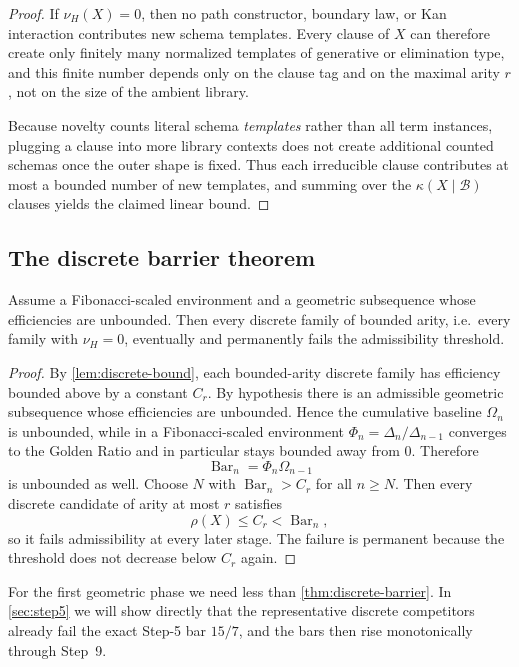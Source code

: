 \documentclass{lmcs}
\newcommand{\B}{\mathcal{B}}
\newcommand{\SelBar}{\operatorname{Bar}}
\begin{document}
\begin{proof}
If $\nu_H(X)=0$, then no path constructor, boundary law, or Kan interaction contributes new schema templates. Every clause of $X$ can therefore create only finitely many normalized templates of generative or elimination type, and this finite number depends only on the clause tag and on the maximal arity $r$, not on the size of the ambient library.

Because novelty counts literal schema \emph{templates} rather than all term instances, plugging a clause into more library contexts does not create additional counted schemas once the outer shape is fixed. Thus each irreducible clause contributes at most a bounded number of new templates, and summing over the $\kappa(X\mid\B)$ clauses yields the claimed linear bound.
\end{proof}

\subsection{The discrete barrier theorem}

\begin{thm}
\label{thm:discrete-barrier}
Assume a Fibonacci-scaled environment and a geometric subsequence whose efficiencies are unbounded. Then every discrete family of bounded arity, i.e.~every family with $\nu_H=0$, eventually and permanently fails the admissibility threshold.
\end{thm}

\begin{proof}
By \autoref{lem:discrete-bound}, each bounded-arity discrete family has efficiency bounded above by a constant $C_r$. By hypothesis there is an admissible geometric subsequence whose efficiencies are unbounded. Hence the cumulative baseline $\Omega_n$ is unbounded, while in a Fibonacci-scaled environment $\Phi_n = \Delta_n/\Delta_{n-1}$ converges to the Golden Ratio and in particular stays bounded away from $0$. Therefore
\[
  \SelBar_n = \Phi_n\Omega_{n-1}
\]
is unbounded as well. Choose $N$ with $\SelBar_n > C_r$ for all $n \geq N$. Then every discrete candidate of arity at most $r$ satisfies
\[
  \rho(X) \leq C_r < \SelBar_n,
\]
so it fails admissibility at every later stage. The failure is permanent because the threshold does not decrease below $C_r$ again.
\end{proof}

\begin{rem}
\label{rem:local-vs-global-barrier}
For the first geometric phase we need less than \autoref{thm:discrete-barrier}. In \autoref{sec:step5} we will show directly that the representative discrete competitors already fail the exact Step-5 bar $15/7$, and the bars then rise monotonically through Step~9.
\end{rem}
\end{document}
